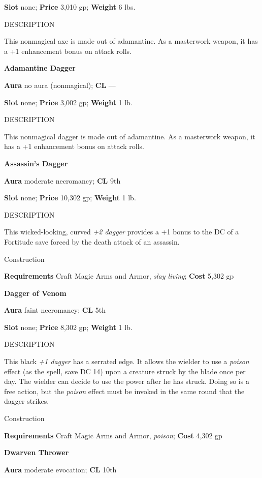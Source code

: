 \textbf{Slot} none; \textbf{Price} 3,010 gp; \textbf{Weight} 6 lbs.
				
DESCRIPTION
				
This nonmagical axe is made out of adamantine. As a masterwork weapon, it has a +1 enhancement bonus on attack rolls. 
				
\textbf{Adamantine Dagger}
				
\textbf{Aura} no aura (nonmagical); \textbf{CL} ---
				
\textbf{Slot} none; \textbf{Price} 3,002 gp; \textbf{Weight} 1 lb.
				
DESCRIPTION
				
This nonmagical dagger is made out of adamantine. As a masterwork weapon, it has a +1 enhancement bonus on attack rolls. 
				
\textbf{Assassin's Dagger}
				
\textbf{Aura} moderate necromancy;\textbf{ CL }9th
				
\textbf{Slot} none; \textbf{Price} 10,302 gp; \textbf{Weight} 1 lb.
				
DESCRIPTION
				
This wicked-looking, curved \textit{+2 dagger} provides a +1 bonus to the DC of a Fortitude save forced by the death attack of an assassin. 
				
Construction
				
\textbf{Requirements} Craft Magic Arms and Armor, \textit{slay living}; \textbf{Cost }5,302 gp
				
\textbf{Dagger of Venom}
				
\textbf{Aura} faint necromancy; \textbf{CL} 5th
				
\textbf{Slot} none; \textbf{Price} 8,302 gp; \textbf{Weight} 1 lb.
				
DESCRIPTION
				
This black \textit{+1 dagger} has a serrated edge. It allows the wielder to use a \textit{poison} effect (as the spell, save DC 14) upon a creature struck by the blade once per day. The wielder can decide to use the power after he has struck. Doing so is a free action, but the \textit{poison} effect must be invoked in the same round that the dagger strikes. 
				
Construction
				
\textbf{Requirements} Craft Magic Arms and Armor, \textit{poison}; \textbf{Cost }4,302 gp
				
\textbf{Dwarven Thrower}
				
\textbf{Aura} moderate evocation; \textbf{CL} 10th
				
